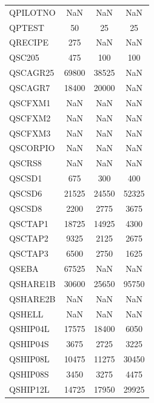 \begin{longtable}{lccc}
QPILOTNO &           NaN &           NaN &           NaN \\
QPTEST   &            50 &            25 &            25 \\
QRECIPE  &           275 &           NaN &           NaN \\
QSC205   &           475 &           100 &           100 \\
QSCAGR25 &         69800 &         38525 &           NaN \\
QSCAGR7  &         18400 &         20000 &           NaN \\
QSCFXM1  &           NaN &           NaN &           NaN \\
QSCFXM2  &           NaN &           NaN &           NaN \\
QSCFXM3  &           NaN &           NaN &           NaN \\
QSCORPIO &           NaN &           NaN &           NaN \\
QSCRS8   &           NaN &           NaN &           NaN \\
QSCSD1   &           675 &           300 &           400 \\
QSCSD6   &         21525 &         24550 &         52325 \\
QSCSD8   &          2200 &          2775 &          3675 \\
QSCTAP1  &         18725 &         14925 &          4300 \\
QSCTAP2  &          9325 &          2125 &          2675 \\
QSCTAP3  &          6500 &          2750 &          1625 \\
QSEBA    &         67525 &           NaN &           NaN \\
QSHARE1B &         30600 &         25650 &         95750 \\
QSHARE2B &           NaN &           NaN &           NaN \\
QSHELL   &           NaN &           NaN &           NaN \\
QSHIP04L &         17575 &         18400 &          6050 \\
QSHIP04S &          3675 &          2725 &          3225 \\
QSHIP08L &         10475 &         11275 &         30450 \\
QSHIP08S &          3450 &          3275 &          4475 \\
QSHIP12L &         14725 &         17950 &         29925 \\

\end{longtable}
